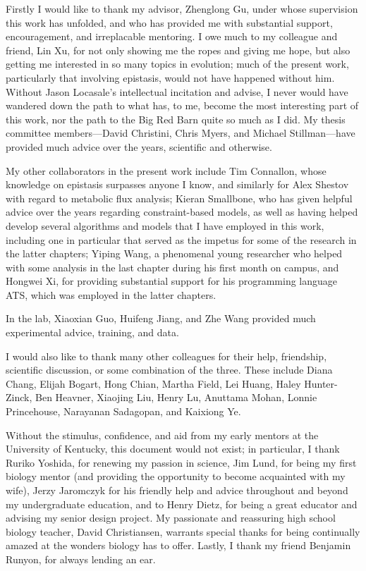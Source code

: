 \documentclass[phd,tocprelim]{cornell}
\theoremstyle{break}
\theoremstyle{empty}
\begin{document}
\begin{acknowledgements}
Firstly I would like to thank my advisor,  Zhenglong Gu, under
whose supervision this work has unfolded, and who has provided me with
substantial support, encouragement, and irreplacable mentoring. I owe
much to my colleague and friend, Lin Xu, for not only showing me
the ropes and giving me hope, but also getting me interested in so
many topics in evolution; much of the present work, particularly that
involving epistasis, would not have happened without him. Without
Jason Locasale's intellectual incitation and advise, I never would
have wandered down the path to what has, to me, become the most
interesting part of this work, nor the path to the Big Red Barn quite
so much as I did. My thesis committee members---David Christini,
Chris Myers, and Michael Stillman---have provided much advice
over the years, scientific and otherwise.

My other collaborators in the present work include Tim Connallon,
whose knowledge on epistasis surpasses anyone I know, and similarly
for Alex Shestov with regard to metabolic flux analysis;
Kieran Smallbone, who has given helpful advice over the years 
regarding constraint-based models, as well as having helped develop several  
algorithms and models that I have employed in this work, including one in 
particular that served as the impetus for some of the research in the latter 
chapters; Yiping Wang, a phenomenal young researcher who helped
with some analysis in the last chapter during his first month on
campus, and Hongwei Xi, for providing substantial support for his
programming language ATS, which was employed in the latter chapters.

In the lab, Xiaoxian Guo, Huifeng Jiang, and Zhe Wang
provided much experimental advice, training, and data.

I would also like to thank many other colleagues for their help,
friendship, scientific discussion, or some combination of
the three. These include Diana Chang, Elijah Bogart, 
Hong Chian, Martha Field, Lei Huang,
Haley Hunter-Zinck, Ben Heavner, Xiaojing Liu, Henry Lu, Anuttama Mohan,
Lonnie Princehouse, Narayanan Sadagopan, and Kaixiong Ye.

Without the stimulus, confidence, and aid from my early mentors at the
University of Kentucky, this document would not exist; in particular,
I thank Ruriko Yoshida, for renewing my passion in science,
Jim Lund, for being my first biology mentor (and providing the
opportunity to become acquainted with my wife), Jerzy Jaromczyk
for his friendly help and advice throughout and beyond my
undergraduate education, and to Henry Dietz, for being a great
educator and advising my senior design project.  My passionate and
reassuring high school biology teacher, David Christiansen,
warrants special thanks for being continually amazed at the wonders
biology has to offer. Lastly, I thank my friend Benjamin Runyon,
for always lending an ear.
\end{acknowledgements}
\end{document}
